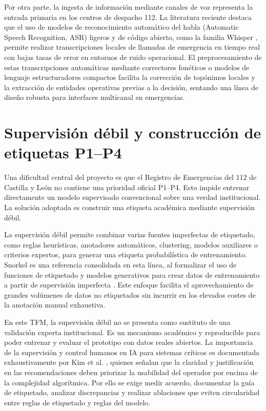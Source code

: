 Por otra parte, la ingesta de información mediante canales de voz representa la entrada primaria en los centros de despacho 112. La literatura reciente destaca que el uso de modelos de reconocimiento automático del habla (Automatic Speech Recognition, ASR) ligeros y de código abierto, como la familia Whisper \cite{Minulescu2025Whisper}, permite realizar transcripciones locales de llamadas de emergencia en tiempo real con bajas tasas de error en entornos de ruido operacional. El preprocesamiento de estas transcripciones automáticas mediante correctores fonéticos o modelos de lenguaje estructuradores compactos facilita la corrección de topónimos locales y la extracción de entidades operativas previas a la decisión, sentando una línea de diseño robusta para interfaces multicanal en emergencias.

\section{Supervisión débil y construcción de etiquetas P1--P4}

Una dificultad central del proyecto es que el Registro de Emergencias del 112 de Castilla y León no contiene una prioridad oficial P1--P4. Esto impide entrenar directamente un modelo supervisado convencional sobre una verdad institucional. La solución adoptada es construir una etiqueta académica mediante supervisión débil.

La supervisión débil permite combinar varias fuentes imperfectas de etiquetado, como reglas heurísticas, anotadores automáticos, clustering, modelos auxiliares o criterios expertos, para generar una etiqueta probabilística de entrenamiento. Snorkel es una referencia consolidada en esta línea, al formalizar el uso de funciones de etiquetado y modelos generativos para crear datos de entrenamiento a partir de supervisión imperfecta \cite{Ratner2020Snorkel}. Este enfoque facilita el aprovechamiento de grandes volúmenes de datos no etiquetados sin incurrir en los elevados costes de la anotación manual exhaustiva.

En este TFM, la supervisión débil no se presenta como sustituto de una validación experta institucional. Es un mecanismo académico y reproducible para poder entrenar y evaluar el prototipo con datos reales abiertos. La importancia de la supervisión y control humanos en IA para sistemas críticos es documentada exhaustivamente por Kim et al. , quienes señalan que la claridad y justificación en las recomendaciones deben priorizar la usabilidad del operador por encima de la complejidad algorítmica. Por ello se exige medir acuerdo, documentar la guía de etiquetado, analizar discrepancias y realizar ablaciones que eviten circularidad entre reglas de etiquetado y reglas del modelo.

